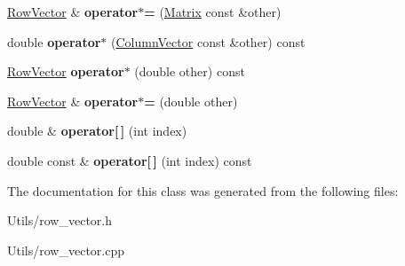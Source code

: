 \begin{DoxyCompactItemize}
\hyperlink{classRowVector}{Row\+Vector} \& {\bfseries operator$\ast$=} (\hyperlink{classMatrix}{Matrix} const \&other)
\item 
\mbox{\label{classRowVector_a39aa97bfe83a14266210ef920fc4ae2e}} 
double {\bfseries operator$\ast$} (\hyperlink{classColumnVector}{Column\+Vector} const \&other) const
\item 
\mbox{\label{classRowVector_a1346204dc2003db81e32935d0b997747}} 
\hyperlink{classRowVector}{Row\+Vector} {\bfseries operator$\ast$} (double other) const
\item 
\mbox{\label{classRowVector_aea8a338f0a33fccbd97370052781b55b}} 
\hyperlink{classRowVector}{Row\+Vector} \& {\bfseries operator$\ast$=} (double other)
\item 
\mbox{\label{classRowVector_a5c22db91fff788c4f325af9658243e72}} 
double \& {\bfseries operator\mbox{[}$\,$\mbox{]}} (int index)
\item 
\mbox{\label{classRowVector_aac012b6ecc5291688842ea4fc5d5233e}} 
double const  \& {\bfseries operator\mbox{[}$\,$\mbox{]}} (int index) const
\end{DoxyCompactItemize}


The documentation for this class was generated from the following files\+:\begin{DoxyCompactItemize}
\item 
Utils/row\+\_\+vector.\+h\item 
Utils/row\+\_\+vector.\+cpp\end{DoxyCompactItemize}
